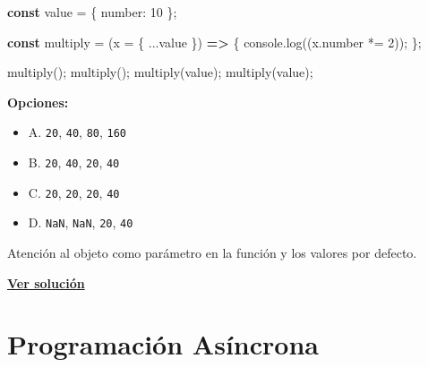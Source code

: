 \documentclass[
  letterpaper,
  DIV=11,
  numbers=noendperiod]{scrreprt}
\newenvironment{Shaded}{\begin{snugshade}}{\end{snugshade}}
\newcommand{\AttributeTok}[1]{\textcolor[rgb]{0.40,0.45,0.13}{#1}}
\newcommand{\BuiltInTok}[1]{\textcolor[rgb]{0.00,0.23,0.31}{#1}}
\newcommand{\DataTypeTok}[1]{\textcolor[rgb]{0.68,0.00,0.00}{#1}}
\newcommand{\DecValTok}[1]{\textcolor[rgb]{0.68,0.00,0.00}{#1}}
\newcommand{\FunctionTok}[1]{\textcolor[rgb]{0.28,0.35,0.67}{#1}}
\newcommand{\KeywordTok}[1]{\textcolor[rgb]{0.00,0.23,0.31}{\textbf{#1}}}
\newcommand{\NormalTok}[1]{\textcolor[rgb]{0.00,0.23,0.31}{#1}}
\newcommand{\OperatorTok}[1]{\textcolor[rgb]{0.37,0.37,0.37}{#1}}
\providecommand{\tightlist}{%
  \setlength{\itemsep}{0pt}\setlength{\parskip}{0pt}}
\begin{document}
\begin{Shaded}
\begin{Highlighting}[]
\KeywordTok{const}\NormalTok{ value }\OperatorTok{=}\NormalTok{ \{ }\DataTypeTok{number}\OperatorTok{:} \DecValTok{10}\NormalTok{ \}}\OperatorTok{;}

\KeywordTok{const}\NormalTok{ multiply }\OperatorTok{=}\NormalTok{ (x }\OperatorTok{=}\NormalTok{ \{ }\OperatorTok{...}\NormalTok{value \}) }\KeywordTok{=\textgreater{}}\NormalTok{ \{}
  \BuiltInTok{console}\OperatorTok{.}\FunctionTok{log}\NormalTok{((x}\OperatorTok{.}\AttributeTok{number} \OperatorTok{*=} \DecValTok{2}\NormalTok{))}\OperatorTok{;}
\NormalTok{\}}\OperatorTok{;}

\FunctionTok{multiply}\NormalTok{()}\OperatorTok{;}
\FunctionTok{multiply}\NormalTok{()}\OperatorTok{;}
\FunctionTok{multiply}\NormalTok{(value)}\OperatorTok{;}
\FunctionTok{multiply}\NormalTok{(value)}\OperatorTok{;}
\end{Highlighting}
\end{Shaded}

\textbf{Opciones:}

\begin{itemize}
\tightlist
\item
  A. \texttt{20}, \texttt{40}, \texttt{80}, \texttt{160}
\item
  B. \texttt{20}, \texttt{40}, \texttt{20}, \texttt{40}
\item
  C. \texttt{20}, \texttt{20}, \texttt{20}, \texttt{40}
\item
  D. \texttt{NaN}, \texttt{NaN}, \texttt{20}, \texttt{40}
\end{itemize}

\begin{tcolorbox}[enhanced jigsaw, left=2mm, toprule=.15mm, leftrule=.75mm, breakable, colback=white, coltitle=black, bottomtitle=1mm, arc=.35mm, rightrule=.15mm, colframe=quarto-callout-tip-color-frame, opacitybacktitle=0.6, toptitle=1mm, opacityback=0, titlerule=0mm, title=\textcolor{quarto-callout-tip-color}{\faLightbulb}\hspace{0.5em}{Pista}, bottomrule=.15mm, colbacktitle=quarto-callout-tip-color!10!white]

Atención al objeto como parámetro en la función y los valores por
defecto.

\end{tcolorbox}

\textbf{\hyperref[sec-sol-cap7-reto9]{Ver solución}}

\chapter{Programación Asíncrona}\label{programaciuxf3n-asuxedncrona}
\end{document}
